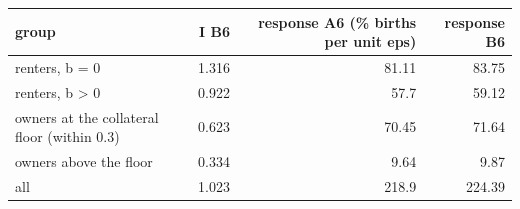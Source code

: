 \begin{tabular}{lrrr}
\toprule
group & I B6 & response A6 (\% births per unit eps) & response B6 \\
\midrule
renters, b = 0 & 1.316 & 81.11 & 83.75 \\
renters, b > 0 & 0.922 & 57.7 & 59.12 \\
owners at the collateral floor (within 0.3) & 0.623 & 70.45 & 71.64 \\
owners above the floor & 0.334 & 9.64 & 9.87 \\
all & 1.023 & 218.9 & 224.39 \\
\bottomrule
\end{tabular}
